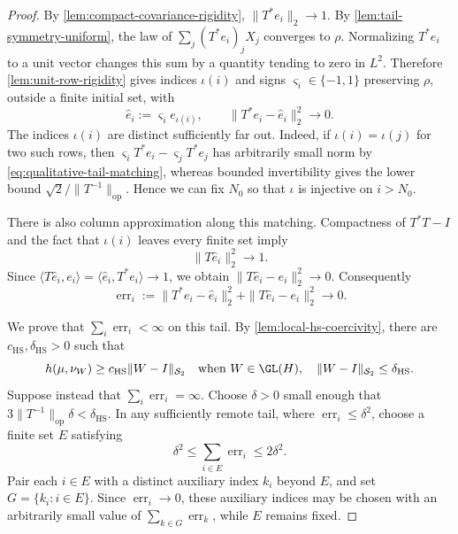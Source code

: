 \begin{proof}
By \cref{lem:compact-covariance-rigidity}, $\|T^*e_i\|_2\to1$.
By \cref{lem:tail-symmetry-uniform}, the law of
$\sum_j(T^*e_i)_jX_j$ converges to $\rho$.
Normalizing $T^*e_i$ to a unit vector changes this sum by a quantity tending to
zero in $L^2$.
Therefore \cref{lem:unit-row-rigidity} gives indices $\iota(i)$ and signs
$\varsigma_i\in\{-1,1\}$ preserving $\rho$, outside a finite initial set, with
\begin{equation}
 \widehat e_i:=\varsigma_i e_{\iota(i)},\qquad
 \|T^*e_i-\widehat e_i\|_2^2\longrightarrow0.
 \label{eq:qualitative-tail-matching}
 \end{equation}
The indices $\iota(i)$ are distinct sufficiently far out.
Indeed, if
$\iota(i)=\iota(j)$ for two such rows, then
$\varsigma_iT^*e_i-\varsigma_jT^*e_j$ has arbitrarily small norm
by \eqref{eq:qualitative-tail-matching}, whereas bounded
invertibility gives the lower bound $\sqrt2/\|T^{-1}\|_{\mathrm{op}}$.
Hence we can fix $N_0$ so that $\iota$ is injective on $i>N_0$.

There is also column approximation along this matching.
Compactness
of $T^*T-I$ and the fact that $\iota(i)$ leaves every finite set imply
\[
 \|T\widehat e_i\|_2^2\longrightarrow1.
\]
Since $\langle T\widehat e_i,e_i\rangle
=\langle \widehat e_i,T^*e_i\rangle\to1$,
we obtain $\|T\widehat e_i-e_i\|_2^2\to0$.  Consequently
\begin{equation}
 \operatorname{err}_i:=\|T^*e_i-\widehat e_i\|_2^2
       +\|T\widehat e_i-e_i\|_2^2\longrightarrow0.
 \label{eq:row-column-tail-errors}
\end{equation}

We prove that $\sum_i\operatorname{err}_i<\infty$ on this tail.
By
\cref{lem:local-hs-coercivity}, there are
$c_{\mathrm{HS}},\delta_{\mathrm{HS}}>0$ such
that
\begin{equation}
 h(\mu,\nu_W)\geq c_{\mathrm{HS}}\|W-I\|_{\mathcal S_2}
 \quad\text{when }W\in\GL(H),\quad
 \|W-I\|_{\mathcal S_2}\leq\delta_{\mathrm{HS}}.
 \label{eq:local-lower-used}
\end{equation}
Suppose instead that $\sum_i\operatorname{err}_i=\infty$.
Choose $\delta>0$ small enough that
$3\|T^{-1}\|_{\mathrm{op}}\delta<\delta_{\mathrm{HS}}$.
In any sufficiently remote tail, where
$\operatorname{err}_i\leq\delta^2$, choose a finite set $E$ satisfying
\begin{equation}
 \delta^2\leq\sum_{i\in E}\operatorname{err}_i\leq2\delta^2.
 \label{eq:active-tail-error}
\end{equation}
Pair each $i\in E$ with a distinct auxiliary index
$k_i$ beyond $E$, and set $G=\{k_i:i\in E\}$.
Since $\operatorname{err}_i\to0$, these auxiliary indices may be chosen with
an arbitrarily small value of $\sum_{k\in G}\operatorname{err}_k$, while
$E$ remains fixed.


\end{proof}
